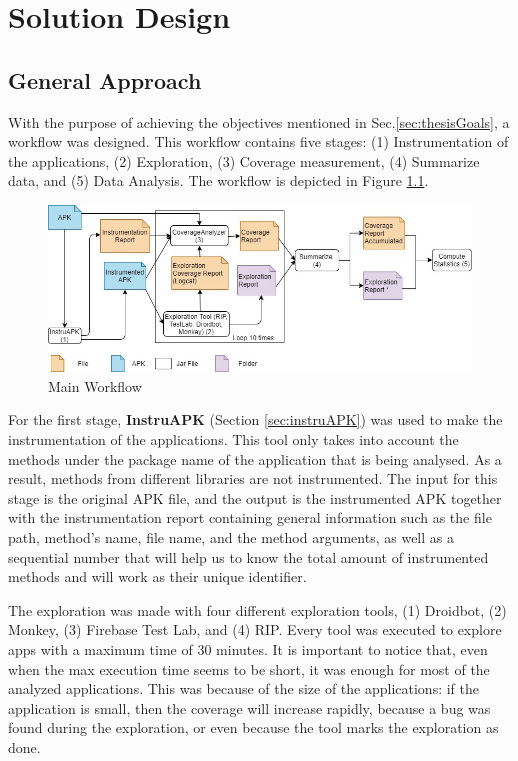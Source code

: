 \chapter{Solution Design} %
\label{Chapter3} %
\section{General Approach} \label{sec:generalApproach}

With the purpose of achieving the objectives mentioned in Sec.\ref{sec:thesisGoals}, a workflow was designed. This workflow contains five stages: (1) Instrumentation of the applications, (2) Exploration, (3) Coverage measurement, (4) Summarize data, and (5)  Data Analysis. The workflow is depicted in Figure \ref{fig:workflow}.

\begin{figure}[h]
\centering
\includegraphics[width=\textwidth]{../Figures/workflow.jpg}
\caption{Main Workflow}\label{fig:workflow}
\end{figure}

For the first stage, \textbf{InstruAPK} (Section \ref{sec:instruAPK}) was used to make the instrumentation of the applications. This tool only takes into account the methods under the package name of the application that is being analysed. As a result, methods from different libraries are not instrumented. The input for this stage is the original APK file, and the output is the instrumented APK together with the instrumentation report containing general information such as the file path, method's name, file name, and the method arguments, as well as a sequential number that will help us to know the total amount of instrumented methods and will work as their unique identifier.

The exploration was made with four different exploration tools, (1) Droidbot, (2) Monkey, (3) Firebase Test Lab, and (4) RIP.  Every tool was executed to explore  apps with a maximum time of 30 minutes. It is important to notice that, even when the max execution time seems to be short, it was enough for most of the analyzed applications. This was because of the size of the applications: if the application is small, then the coverage will increase rapidly, because a bug was found during the exploration, or even because the tool marks the exploration as done. 

